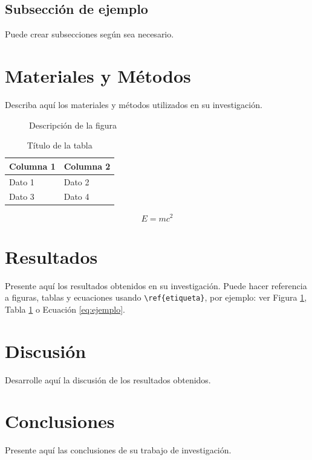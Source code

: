 \documentclass{syx7}
\begin{document}
\subsection{Subsección de ejemplo}
Puede crear subsecciones según sea necesario.

\section{Materiales y Métodos}
Describa aquí los materiales y métodos utilizados en su investigación.

\begin{figure}[htb!]
	\centering
	\caption{Descripción de la figura}
	\label{fig:ejemplo}
\end{figure}

\begin{table}[htb!]
	\caption{Título de la tabla}
	\label{tab:ejemplo}
	\centering
	\begin{tabular}{>{\centering\arraybackslash}p{4cm}>{\centering\arraybackslash}p{4cm}}
		\toprule
		Columna 1 & Columna 2 \\
		\midrule
		Dato 1 & Dato 2 \\
		Dato 3 & Dato 4 \\
		\bottomrule
	\end{tabular}
\end{table}

\begin{equation}
	E = mc^2
	\label{eq:ejemplo}
\end{equation}

\section{Resultados}
Presente aquí los resultados obtenidos en su investigación. Puede hacer referencia a figuras, tablas y ecuaciones usando \texttt{\textbackslash ref\{etiqueta\}}, por ejemplo: ver Figura \ref{fig:ejemplo}, Tabla \ref{tab:ejemplo} o Ecuación \ref{eq:ejemplo}.

\section{Discusión}
Desarrolle aquí la discusión de los resultados obtenidos.

\section{Conclusiones}
Presente aquí las conclusiones de su trabajo de investigación.

\printauthoremails

\pretocmd{\printbibliography}{\vspace{1em}}{}{}
\printbibliography
\end{document}
